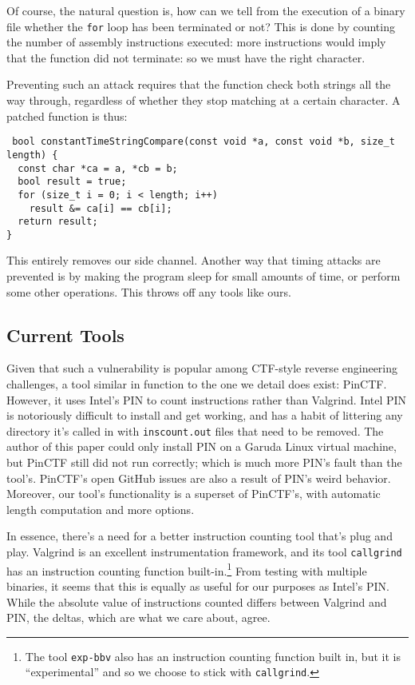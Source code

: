 \documentclass[11pt]{article}
\begin{document}
Of course, the natural question is, how can we tell from the execution
of a binary file whether the \texttt{for} loop has been
terminated or not? This is done by counting the number of assembly
instructions executed: more instructions would imply that the
function did not terminate: so we must have the right character.

Preventing such an attack requires that the function check both
strings all the way through, regardless of whether they stop matching
at a certain character. A patched function is thus:

\begin{verbatim}
 bool constantTimeStringCompare(const void *a, const void *b, size_t length) {
  const char *ca = a, *cb = b;
  bool result = true;
  for (size_t i = 0; i < length; i++)
    result &= ca[i] == cb[i];
  return result;
}
\end{verbatim}

This entirely removes our side channel. Another way that timing
attacks are prevented is by making the program sleep for small amounts
of time, or perform some other operations. This throws off any tools
like ours.

\subsection{Current Tools}
\label{sec:orgf2c33a1}
Given that such a vulnerability is popular among CTF-style reverse
engineering challenges, a tool similar in function to the one we detail
does exist: PinCTF\cite{pinctf}. However, it uses Intel's PIN to count
instructions rather than Valgrind. Intel PIN is notoriously difficult
to install and get working, and has a habit of littering any directory
it's called in with \texttt{inscount.out} files that need to be removed. The
author of this paper could only install PIN on a Garuda Linux virtual
machine, but PinCTF still did not run correctly; which is much more
PIN's fault than the tool's. PinCTF's open GitHub issues are also a
result of PIN's weird behavior. Moreover, our tool's functionality is
a superset of PinCTF's, with automatic length computation and more
options.

In essence, there's a need for a better instruction counting tool
that's plug and play. Valgrind is an excellent instrumentation
framework, and its tool \texttt{callgrind} has an instruction counting
function built-in.\footnote{The tool \texttt{exp-bbv} also has an instruction counting function
built in, but it is ``experimental'' and so we choose to stick with
\texttt{callgrind}.} From testing with multiple binaries, it seems that
this is equally as useful for our purposes as Intel's PIN. While the
absolute value of instructions counted differs between Valgrind and
PIN, the deltas, which are what we care about, agree.
\end{document}
